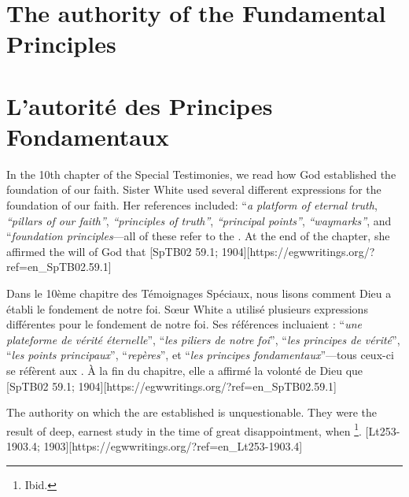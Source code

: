 \chapter{The authority of the Fundamental Principles} \label{chap:authority}


\chapter{L'autorité des Principes Fondamentaux} \label{chap:authority}


In the 10th chapter of the Special Testimonies, we read how God established the foundation of our faith. Sister White used several different expressions for the foundation of our faith. Her references included: “\textit{a platform of eternal truth}, \textit{“pillars of our faith”}, \textit{“principles of truth”}, \textit{“principal points”}, \textit{“waymarks”}, and “\textit{foundation principles}—all of these refer to the . At the end of the chapter, she affirmed the will of God that [SpTB02 59.1; 1904][https://egwwritings.org/?ref=en\_SpTB02.59.1]


Dans le 10ème chapitre des Témoignages Spéciaux, nous lisons comment Dieu a établi le fondement de notre foi. Sœur White a utilisé plusieurs expressions différentes pour le fondement de notre foi. Ses références incluaient : “\textit{une plateforme de vérité éternelle}”, “\textit{les piliers de notre foi}”, “\textit{les principes de vérité}”, “\textit{les points principaux}”, “\textit{repères}”, et “\textit{les principes fondamentaux}”—tous ceux-ci se réfèrent aux . À la fin du chapitre, elle a affirmé la volonté de Dieu que [SpTB02 59.1; 1904][https://egwwritings.org/?ref=en\_SpTB02.59.1]


The authority on which the  are established is unquestionable. They were the result of deep, earnest study in the time of great disappointment, when \footnote{Ibid.}. [Lt253-1903.4; 1903][https://egwwritings.org/?ref=en\_Lt253-1903.4]


